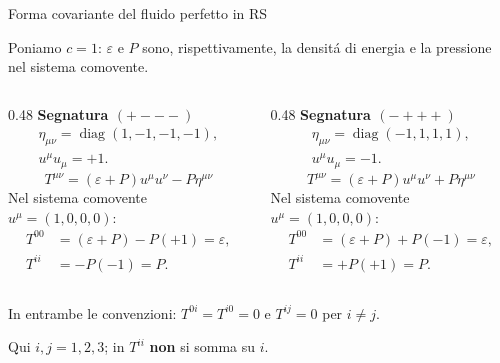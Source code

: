 \begin{frame}[t]{Forma covariante del fluido perfetto in RS}
\small\raggedright
Poniamo $c=1$: $\varepsilon$ e $P$ sono, rispettivamente,
la densit\'a di energia e la pressione nel sistema comovente.

\medskip
\begin{columns}[T,onlytextwidth]
\begin{column}{0.48\textwidth}
\textbf{Segnatura $(+---)$}
\[
\begin{gathered}
\eta_{\mu\nu}=\operatorname{diag}(1,-1,-1,-1),
\\
u^\mu u_\mu=+1.
\end{gathered}
\]
\[
\boxed{
T^{\mu\nu}=(\varepsilon+P)u^\mu u^\nu-P\eta^{\mu\nu}
}
\]
Nel sistema comovente $u^\mu=(1,0,0,0)$:
\[
\begin{aligned}
T^{00}&=(\varepsilon+P)-P(+1)=\varepsilon,\\
T^{ii}&=-P(-1)=P.
\end{aligned}
\]
\end{column}
\begin{column}{0.48\textwidth}
\textbf{Segnatura $(-+++)$}
\[
\begin{gathered}
\eta_{\mu\nu}=\operatorname{diag}(-1,1,1,1),
\\
u^\mu u_\mu=-1.
\end{gathered}
\]
\[
\boxed{
T^{\mu\nu}=(\varepsilon+P)u^\mu u^\nu+P\eta^{\mu\nu}
}
\]
Nel sistema comovente $u^\mu=(1,0,0,0)$:
\[
\begin{aligned}
T^{00}&=(\varepsilon+P)+P(-1)=\varepsilon,\\
T^{ii}&=+P(+1)=P.
\end{aligned}
\]
\end{column}
\end{columns}

\smallskip
In entrambe le convenzioni:
$T^{0i}=T^{i0}=0$ e $T^{ij}=0$ per $i\ne j$.

\smallskip
Qui $i,j=1,2,3$; in $T^{ii}$ \textbf{non} si somma su $i$.
\end{frame}

